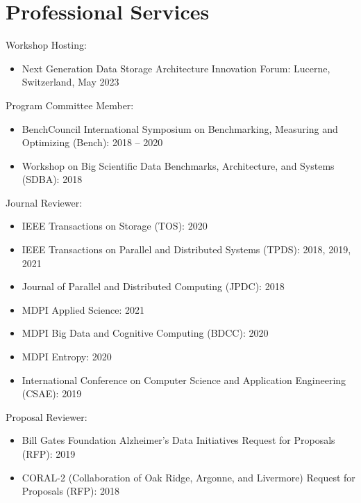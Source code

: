 \section{Professional Services}
Workshop Hosting:
\begin{itemize}
\item {Next Generation Data Storage Architecture Innovation Forum: Lucerne, Switzerland, May 2023}
\end{itemize}
Program Committee Member:
\begin{itemize}
\item {BenchCouncil International Symposium on Benchmarking, Measuring and Optimizing (Bench): 2018 -- 2020}
\item {Workshop on Big Scientific Data Benchmarks, Architecture, and Systems (SDBA): 2018}
\end{itemize}
Journal Reviewer:
\begin{itemize}
\item {IEEE Transactions on Storage (TOS): 2020}
\item {IEEE Transactions on Parallel and Distributed Systems (TPDS): 2018, 2019, 2021}
\item {Journal of Parallel and Distributed Computing (JPDC): 2018}
\item {MDPI Applied Science: 2021}
\item {MDPI Big Data and Cognitive Computing (BDCC): 2020}
\item {MDPI Entropy: 2020}
\item {International Conference on Computer Science and Application Engineering (CSAE): 2019}
\end{itemize}
Proposal Reviewer:
\begin{itemize}
\item {Bill Gates Foundation Alzheimer’s Data Initiatives Request for Proposals (RFP): 2019}
\item {CORAL-2 (Collaboration of Oak Ridge, Argonne, and Livermore) Request for Proposals (RFP): 2018}
\end{itemize}

